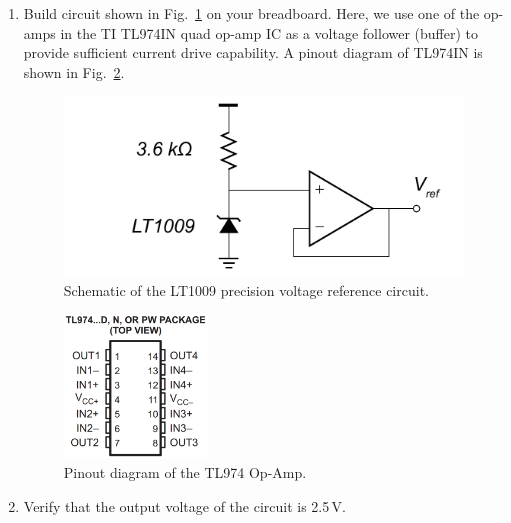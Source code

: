 \documentclass[letterpaper, 11pt]{article}
\begin{document}
\begin{enumerate}
	\item Build circuit shown in Fig.~\ref{fig:lt1009-sch} on your breadboard. Here, we use one of the op-amps in the TI TL974IN quad op-amp IC as a voltage follower (buffer) to provide sufficient current drive capability. A pinout diagram of TL974IN is shown in Fig.~\ref{fig:tl974-pinout}. 
	
	\begin{figure}[h]
		\centering
		\includegraphics[scale=1]{lt1009.pdf}
		\caption{Schematic of the LT1009 precision voltage reference circuit.}
		\label{fig:lt1009-sch}
	\end{figure}

	\begin{figure}[h]
		\centering
		\includegraphics[width=1.5in]{tl974-pinout}
		\caption{Pinout diagram of the TL974 Op-Amp.}
		\label{fig:tl974-pinout}
	\end{figure}

	
	\item Verify that the output voltage of the circuit is 2.5\,V.
\end{enumerate}
\end{document}
